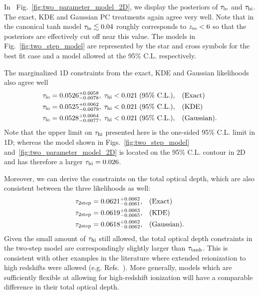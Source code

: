 \documentclass[aps,prd,twocolumn,amsmath,amssymb,showpacs,floatfix,superscriptaddress,nofootinbib]{revtex4-1}
\newcommand{\reffig}[1]{Fig.~\ref{fig:#1}}
\newcommand{\zre}{z_{\rm re}}
\newcommand{\tauhi}{\tau_{\rm hi}}
\newcommand{\taulo}{\tau_{\rm lo}}
\begin{document}
In ~\reffig{two_parameter_model_2D}, we display the posteriors of $\taulo$ and $\tauhi$. The exact, KDE and Gaussian PC treatments again agree very well. 
Note that in the canonical tanh model $\taulo \lesssim 0.04$ roughly corresponds to $\zre < 6$ so that the posteriors are effectively cut off  near this value.
The models in Fig.~\ref{fig:two_step_model} are represented by the star and cross symbols for the best fit case and a model allowed at the 95\% C.L. respectively.

The marginalized 1D constraints from the exact, KDE and Gaussian likelihoods also agree well
\begin{align}
\taulo = 0.0526^{+0.0058}_{-0.0078}, \; \tauhi < 0.021\; (95\% \text{ C.L.}), & \quad({\rm Exact}) \nonumber\\
\taulo = 0.0525^{+0.0062}_{-0.0079}, \; \tauhi < 0.021\;  (95\% \text{ C.L.}), & \quad({\rm KDE}) \nonumber\\
\taulo = 0.0528^{+0.0064}_{- 0.0077}, \; \tauhi < 0.021\; (95\% \text{ C.L.}), & \quad({\rm Gaussian}).
\end{align}
Note that the upper limit on $\tau_{\rm hi}$ presented here is the one-sided 95\% C.L. limit in 1D; whereas the model shown in Figs.~\ref{fig:two_step_model} and~\ref{fig:two_parameter_model_2D} is located on the 95\% C.L. contour in 2D and has therefore a larger $\tau_{\rm hi} = 0.026$.

Moreover, we can derive the constraints on the total optical depth, which are also consistent between the three likelihoods as well:
%
\begin{align}
\tau_{\rm 2step} = 0.0621^{+0.0062}_{-0.0061}, & \quad (\text{Exact)} \nonumber\\
\tau_{\rm 2step} = 0.0619^{+0.0063}_{-0.0065},  & \quad (\text{KDE)} \nonumber\\
\tau_{\rm 2step} = 0.0618^{+0.0062}_{-0.0062}, & \quad (\text{Gaussian).}
\end{align}
%
Given the small amount of $\tau_{\rm hi}$ still allowed, the total optical depth constraints in the two-step model are correspondingly slightly larger than $\tau_{\rm tanh}$.
This is consistent with other examples in the literature where extended reionization to high redshifts were allowed (e.g. Refs.~\cite{Ahn:2020btj, Paoletti:2020ndu}). More generally,
models which are sufficiently flexible at allowing for high-redshift ionization will have a comparable difference in their total optical depth.
\end{document}
